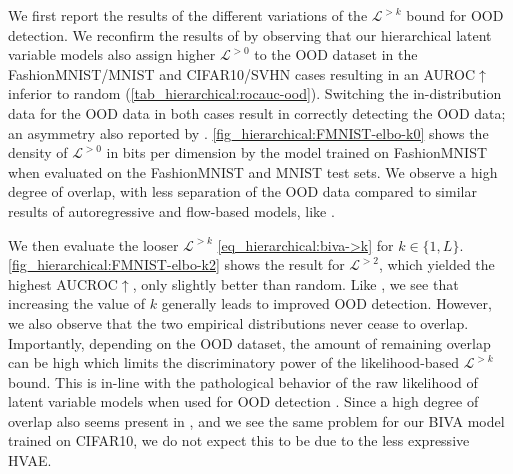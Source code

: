 {We first report the results of the different variations of the $\mathcal{L}^{>k}$ bound for OOD detection. 
We reconfirm the results of \textcite{nalisnick_deep_2019} by observing that our hierarchical latent variable models also assign higher $\mathcal{L}^{>0}$ to the OOD dataset in the FashionMNIST/MNIST and CIFAR10/SVHN cases resulting in an AUROC$\uparrow$ inferior to random (\cref{tab_hierarchical:rocauc-ood}).
Switching the in-distribution data for the OOD data in both cases result in correctly detecting the OOD data; an asymmetry also reported by \textcite{nalisnick_deep_2019}.
\cref{fig_hierarchical:FMNIST-elbo-k0} shows the density of $\mathcal{L}^{>0}$ in bits per dimension \cite{theis_note_2016} by the model trained on FashionMNIST when evaluated on the FashionMNIST and MNIST test sets.
We observe a high degree of overlap, with less separation of the OOD data compared to similar results of autoregressive and flow-based models, like \textcite{xiao_likelihood_2020}.


We then evaluate the looser $\mathcal{L}^{>k}$ \cref{eq_hierarchical:biva->k} for $k\in\{1,L\}$.
\cref{fig_hierarchical:FMNIST-elbo-k2} shows the result for $\mathcal{L}^{>2}$, which yielded the highest AUCROC$\uparrow$, only slightly better than random.
Like \textcite{maaloe_biva_2019}, we see that increasing the value of $k$ generally leads to improved OOD detection.
However, we also observe that the two empirical distributions never cease to overlap.
Importantly, depending on the OOD dataset, the amount of remaining overlap can be high which limits the discriminatory power of the likelihood-based $\mathcal{L}^{>k}$ bound.
This is in-line with the pathological behavior of the raw likelihood of latent variable models when used for OOD detection \cite{xiao_likelihood_2020}.
Since a high degree of overlap also seems present in \textcite{maaloe_biva_2019}, and we see the same problem for our BIVA model trained on CIFAR10, we do not expect this to be due to the less expressive HVAE.


}
